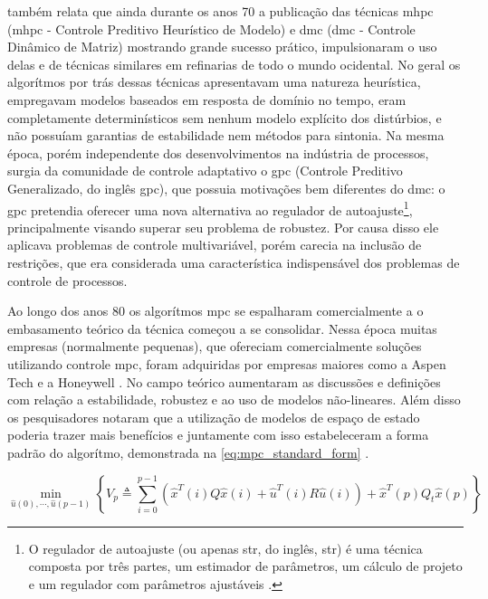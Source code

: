  também relata que ainda durante os anos 70 a publicação das técnicas
\acrlong{mhpc} (\acrshort{mhpc} - Controle Preditivo Heurístico de Modelo) e
\acrlong{dmc} (\acrshort{dmc} - Controle Dinâmico de Matriz) mostrando grande sucesso prático,
impulsionaram o uso delas e de técnicas similares em refinarias de todo o mundo ocidental.
No geral os algorítmos por trás dessas técnicas apresentavam uma natureza heurística,
empregavam modelos baseados em resposta de domínio no tempo, eram completamente determinísticos
sem nenhum modelo explícito dos distúrbios, e não possuíam garantias de estabilidade nem
métodos para sintonia. Na mesma época, porém independente dos desenvolvimentos na indústria
de processos, surgia da comunidade de controle adaptativo o \acrshort{gpc} (Controle Preditivo
Generalizado, do inglês \acrlong{gpc}), que possuia motivações bem diferentes do \acrshort{dmc}:
o \acrshort{gpc} pretendia oferecer uma nova alternativa ao regulador de autoajuste\footnote{
    O regulador de autoajuste (ou apenas \acrshort{str}, do inglês, \acrlong{str}) é uma técnica composta
    por três partes, um estimador de parâmetros, um cálculo de projeto e um regulador com
    parâmetros ajustáveis \cite{Astrom1985}.
}, 
principalmente visando superar seu problema de robustez. Por causa disso ele aplicava problemas de controle
multivariável, porém carecia na inclusão de restrições, que era considerada uma característica
indispensável dos problemas de controle de processos.

Ao longo dos anos 80 os algorítmos \acrshort{mpc} se espalharam comercialmente a o embasamento
teórico da técnica começou a se consolidar. Nessa época muitas empresas (normalmente pequenas),
que ofereciam comercialmente soluções utilizando controle \acrshort{mpc}, foram adquiridas por
empresas maiores como a Aspen Tech e a Honeywell \cite{Lee2011}. No campo teórico aumentaram as discussões e
definições com relação a estabilidade, robustez e ao uso de modelos não-lineares. Além disso
os pesquisadores notaram que a utilização de modelos de espaço de estado poderia trazer mais
benefícios e juntamente com isso estabeleceram a forma padrão do algorítmo, demonstrada na
\cref{eq:mpc_standard_form} \cite{Lee2011} .

\begin{equation}
	\label{eq:mpc_standard_form}
    \min_{\hat{u}(0),\cdots,\hat{u}(p-1)}
    \left\{
        V_p \triangleq \displaystyle\sum_{i=0}^{p-1}
            \left(\hat{x}^T(i)Q\hat{x}(i) + \hat{u}^T(i)R\hat{u}(i) \right)
            + \hat{x}^T(p)Q_t\hat{x}(p)
    \right\}
\end{equation}

